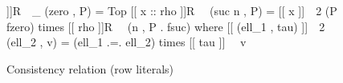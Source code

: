 \begin{figure}
\begin{agdaf}
[[ [] ]]R~~_ (zero , P) = Top
[[ x :: rho ]]R~~ (suc n , P) = 
  [[ x ]]~~2 (P fzero) times [[ rho ]]R~~ (n , P . fsuc)
  where
    [[ (ell_1 , tau) ]]~~2 (ell_2 , v) = (ell_1 .=. ell_2) times [[ tau ]]~~ v 
\end{agdaf}
\caption{Consistency relation (row literals)}
\label{fig:consistency-relation-row-literals}
\end{figure}